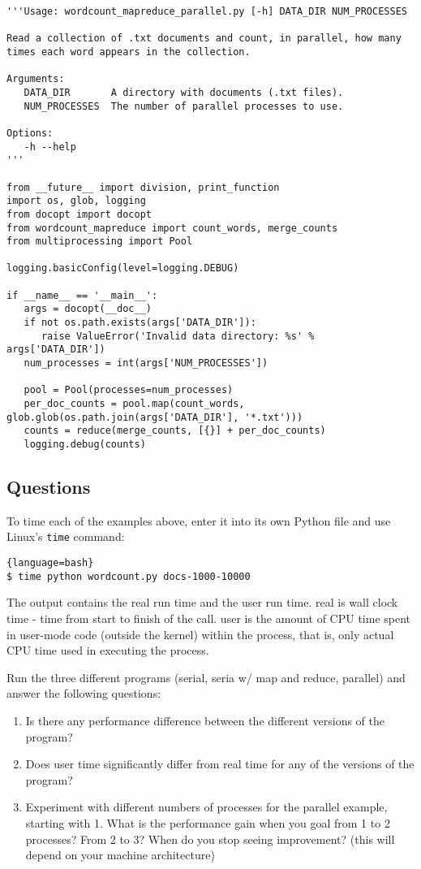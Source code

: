 \begin{lstlisting}
'''Usage: wordcount_mapreduce_parallel.py [-h] DATA_DIR NUM_PROCESSES

Read a collection of .txt documents and count, in parallel, how many
times each word appears in the collection.

Arguments:
   DATA_DIR       A directory with documents (.txt files).
   NUM_PROCESSES  The number of parallel processes to use.

Options:
   -h --help
'''

from __future__ import division, print_function
import os, glob, logging
from docopt import docopt
from wordcount_mapreduce import count_words, merge_counts
from multiprocessing import Pool

logging.basicConfig(level=logging.DEBUG)

if __name__ == '__main__':
   args = docopt(__doc__)
   if not os.path.exists(args['DATA_DIR']):
      raise ValueError('Invalid data directory: %s' % args['DATA_DIR'])
   num_processes = int(args['NUM_PROCESSES'])

   pool = Pool(processes=num_processes)
   per_doc_counts = pool.map(count_words, glob.glob(os.path.join(args['DATA_DIR'], '*.txt')))
   counts = reduce(merge_counts, [{}] + per_doc_counts)
   logging.debug(counts)
\end{lstlisting}

\subsection{Questions}

To time each of the examples above, enter it into its own Python file
and use Linux's \texttt{time} command:


\begin{lstlisting}{language=bash}
$ time python wordcount.py docs-1000-10000
\end{lstlisting}

The output contains the real run time and the user run time. real is
wall clock time - time from start to finish of the call. user is the
amount of CPU time spent in user-mode code (outside the kernel) within
the process, that is, only actual CPU time used in executing the
process.

Run the three different programs (serial, seria w/ map and reduce,
parallel) and answer the following questions:

\begin{enumerate}
\item Is there any performance difference between the different
  versions of the program?
\item
  Does user time significantly differ from real time for any of the
  versions of the program?
\item
  Experiment with different numbers of processes for the parallel
  example, starting with 1. What is the performance gain when you goal
  from 1 to 2 processes? From 2 to 3? When do you stop seeing
  improvement? (this will depend on your machine architecture)
\end{enumerate}

